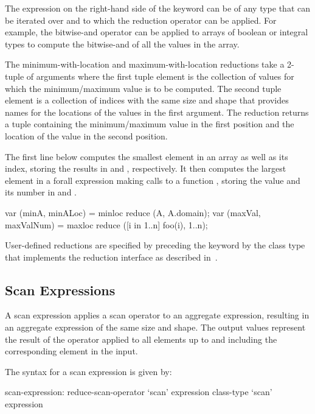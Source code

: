 The expression on the right-hand side of the  keyword
can be of any type that can be iterated over and to which the
reduction operator can be applied.  For example, the bitwise-and
operator can be applied to arrays of boolean or integral types to
compute the bitwise-and of all the values in the array.

The minimum-with-location and maximum-with-location reductions take a
2-tuple of arguments where the first tuple element is the collection
of values for which the minimum/maximum value is to be computed.  The
second tuple element is a collection of indices with the same size and
shape that provides names for the locations of the values in the first
argument.  The reduction returns a tuple containing the
minimum/maximum value in the first position and the location of the
value in the second position.

\begin{example}
The first line below computes the smallest element in an array
 as well as its index, storing the results in  and
, respectively.  It then computes the largest element in
a forall expression making calls to a function , storing
the value and its number in  and .
\begin{chapel}
var (minA, minALoc) = minloc reduce (A, A.domain); 
var (maxVal, maxValNum) = maxloc reduce ([i in 1..n] foo(i), 1..n);
\end{chapel}
\end{example}

User-defined reductions are specified by preceding the
keyword  by the class type that implements the reduction
interface as described in~.

\subsection{Scan Expressions}
\label{scan}

A scan expression applies a scan operator to an aggregate expression,
resulting in an aggregate expression of the same size and shape.  The
output values represent the result of the operator applied to all
elements up to and including the corresponding element in the input.

The syntax for a scan expression is given by:
\begin{syntax}
scan-expression:
  reduce-scan-operator `scan' expression
  class-type `scan' expression
\end{syntax}

